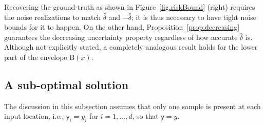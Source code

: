 
\begin{remark}
	Recovering the ground-truth as shown in Figure~\ref{fig.riskBound} (right) requires the noise realizations to match $\bar \delta$ and $-\bar \delta$; it is thus necessary to have tight noise bounds for it to happen. On the other hand, Proposition~\ref{prop.decreasing} guarantees the decreasing uncertainty property regardless of how accurate $\bar \delta$ is. Although not explicitly stated, a completely analogous result holds for the lower part of the envelope $\text{B}(x)$.
\end{remark}

\subsection{A sub-optimal solution}

The discussion in this subsection assumes that only one sample is present at each input location, i.e., $\mathsf{y}_i = y_i$ for $i=1,\dots,d $, so that $\mathsf{y}=y$.

